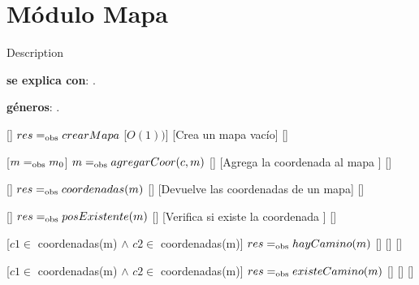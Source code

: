 \section{Módulo Mapa}

Description %

\begin{Interfaz}
	\textbf{se explica con}: .

	\textbf{géneros}: .


	[]
	{$res =_{\mathrm{obs}} crearMapa$}
	[$O(1))$]
	[Crea un mapa vacío]
	[]

	[$m =_{\mathrm{obs}} m_0$]
	{$m =_{\mathrm{obs}} agregarCoor(c,m)$}
	[]
	[Agrega la coordenada al mapa ]
	[]

	[]
	{$res =_{\mathrm{obs}} coordenadas(m)$}
	[]
	[Devuelve las coordenadas de un mapa]
	[]

	[]
	{$res =_{\mathrm{obs}} posExistente(m)$}
	[]
	[Verifica si existe la coordenada ]
	[]

	[$c1 \in$ coordenadas(m) $\land$ $c2 \in$ coordenadas(m)]
	{$res =_{\mathrm{obs}} hayCamino(m)$}
	[]
	[]
	[]

	[$c1 \in$ coordenadas(m) $\land$ $c2 \in$ coordenadas(m)]
	{$res =_{\mathrm{obs}} existeCamino(m)$}
	[]
	[]
	[]
\end{Interfaz}


